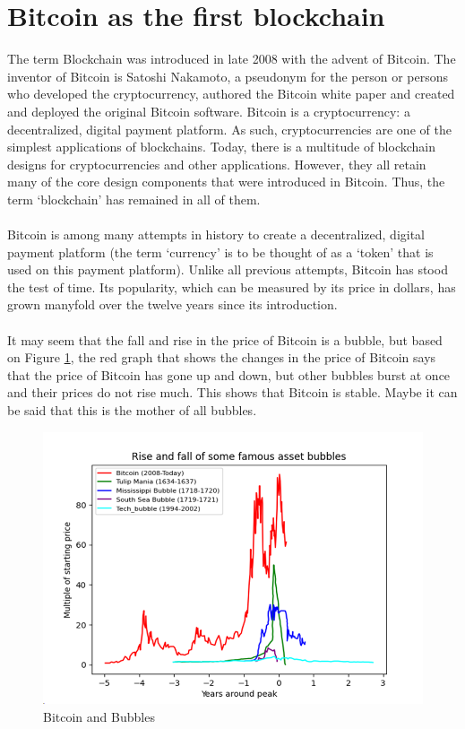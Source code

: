 \section{Bitcoin as the first blockchain}
The term Blockchain was introduced in late 2008 with the advent of Bitcoin. The inventor of Bitcoin is Satoshi Nakamoto, a pseudonym for the person or persons who developed the cryptocurrency, authored the Bitcoin white paper and created and deployed the original Bitcoin software. Bitcoin is a cryptocurrency: a decentralized, digital payment platform. As such, cryptocurrencies are one of the simplest applications of blockchains. Today, there is a multitude of blockchain designs for cryptocurrencies and other applications. However, they all retain many of the core design components that were
introduced in Bitcoin. Thus, the term ‘blockchain’ has remained in all of them.\\\\
Bitcoin is among many attempts in history to create a decentralized, digital payment platform (the term ‘currency’ is to be thought of as a ‘token’ that is used on this payment platform). Unlike all previous attempts, Bitcoin has stood the test of time. Its popularity, which can be measured by its price in dollars, has grown manyfold over the twelve years since its introduction.\\\\
It may seem that the fall and rise in the price of Bitcoin is a bubble, but based on Figure \ref{fig:f2}, the red graph that shows the changes in the price of Bitcoin says that the price of Bitcoin has gone up and down, but other bubbles burst at once and their prices do not rise much. This shows that Bitcoin is stable. Maybe it can be said that this is the mother of all bubbles.
\begin{figure}
    \centering
    \includegraphics[width=0.6\linewidth]{Fig/01/F2}
    \caption{Bitcoin and Bubbles}
    \label{fig:f2}
\end{figure}
